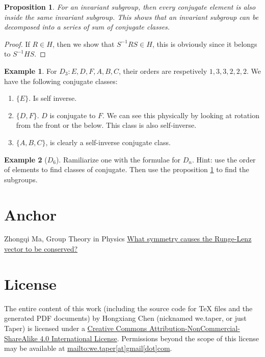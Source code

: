 \documentclass{article}
\numberwithin{equation}{subsection} %
\newtheorem{prop}{Proposition}[section]
\theoremstyle{definition}
\newtheorem{ex}{Example}[section]
\begin{document}
\begin{prop}
    \label{prop:20161010.conjugate_subgroup}
    For an invariant subgroup, then every conjugate element is also
    inside the same invariant subgroup. This shows that an invariant
    subgroup can be decomposed into a series of sum of conjugate classes.
\end{prop}
\begin{proof}
    If $R\in H$, then we show that $S^{-1}RS\in H$, this is obviously
    since it belongs to $S^{-1}HS$.
\end{proof}

\begin{ex}
    For $D_3: E,D,F,A,B,C$, their orders are respetively
    $1,3,3,2,2,2$. We have the following conjugate classes:
    \begin{enumerate}
        \item $\{ E\}$. Is self inverse.
        \item $\{ D,F\}$. $D$ is conjugate to $F$. We can see
            this physically by looking at rotation from the front
            or the below. This class is also self-inverse.
        \item $\{A,B,C\}$, is clearly a self-inverse conjugate
            class.
    \end{enumerate}
\end{ex}
\begin{ex}[$D_6$]
    Ramiliarize one with the formulae for $D_n$. Hint: use the order of
    elements to find classes of conjugate. Then use the proposition
    \ref{prop:20161010.conjugate_subgroup} to find the subgroups.
\end{ex}





\section{Anchor}
\label{sec:Anchor}
\begin{thebibliography}{1}
     Zhongqi Ma, Group Theory in Physics
     \href{physics.stackexchange.com/questions/18088/what-symmetry-causes-the-runge-lenz-vector-to-be-conserved}{What symmetry causes the Runge-Lenz vector to be conserved?}
\end{thebibliography}
\printnomenclature
\section{License}
The entire content of this work (including the source code
for TeX files and the generated PDF documents) by 
Hongxiang Chen (nicknamed we.taper, or just Taper) is
licensed under a 
\href{http://creativecommons.org/licenses/by-nc-sa/4.0/}{Creative 
Commons Attribution-NonCommercial-ShareAlike 4.0 International 
License}. Permissions beyond the scope of this 
license may be available at \url{mailto:we.taper[at]gmail[dot]com}.
\end{document}
